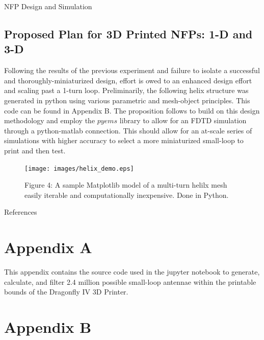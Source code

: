 \documentclass[12pt]{article}
\begin{document}
\begin{section} {NFP Design and Simulation}
\subsection{Proposed Plan for 3D Printed NFPs: 1-D and 3-D}

Following the results of the previous experiment and failure to isolate a successful and thoroughly-miniaturized design, effort is owed to an enhanced design effort and scaling past a 1-turn loop. Preliminarily, the following helix structure was generated in python using various parametric and mesh-object principles.  This code can be found in Appendix B. The proposition follows to build on this design methodology and employ the $pyems$ library to allow for an FDTD simulation through a python-matlab connection.  This should allow for an at-scale series of simulations with higher accuracy to select a more miniaturized small-loop to print and then test.

\begin{figure}
    \centering
    \texttt{[image: images/helix\_demo.eps]}
    \caption{Figure 4: A sample Matplotlib model of a multi-turn helilx mesh easily iterable and computationally inexpensive. Done in Python.}
    \label{fig:4}
\end{figure}



\end{section}


\bibname{References}


\appendix

\section{Appendix A}
\label{Appendix A}

This appendix contains the source code used in the jupyter notebook to generate, calculate, and filter 2.4 million possible small-loop antennae within the printable bounds of the Dragonfly IV 3D Printer.



\section{Appendix B}
\label{Appendix B}


\end{document}
